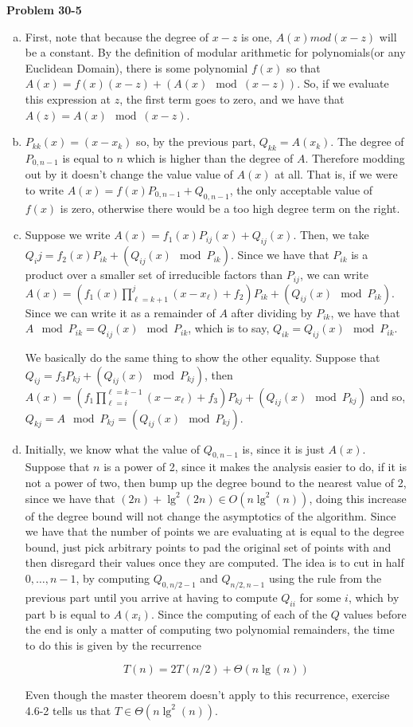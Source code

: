 \documentclass{article}
\begin{document}
\noindent\textbf{Problem 30-5}\\
\begin{enumerate}[a.]
\item
First, note that because the degree of $x-z$ is one, $A(x)mod(x-z)$ will be a constant. By the definition of modular arithmetic for polynomials(or any Euclidean Domain), there is some polynomial $f(x)$ so that $A(x) = f(x)(x-z) + (A(x) \mod(x-z))$. So, if we evaluate this expression at $z$, the first term goes to zero, and we have that $A(z) = A(x)\mod (x-z)$.
\item
$P_{kk}(x) = (x-x_k)$ so, by the previous part, $Q_{kk} = A(x_k)$. The degree of $P_{0,n-1}$ is equal to $n$ which is higher than the degree of $A$. Therefore modding out by it doesn't change the value value of $A(x)$ at all. That is, if we were to write $A(x) = f(x) P_{0,n-1} + Q_{0,n-1}$, the only acceptable value of $f(x)$ is zero, otherwise there would be a too high degree term on the right.
\item
Suppose we write $A(x) = f_1(x) P_{ij}(x) +Q_{ij}(x)$. Then, we take $Q_ij = f_2(x) P_{ik} + (Q_{ij}(x) \mod P_{ik})$. Since we have that $P_{ik}$ is a product over a smaller set of irreducible factors than $P_{ij}$, we can write $A(x) =(f_1(x)\prod_{\ell = k+1}^j (x-x_\ell) + f_2) P_{ik} + (Q_{ij}(x) \mod P_{ik})$. Since we can write it as a remainder of $A$ after dividing by $P_{ik}$, we have that $A \mod P_{ik} =  Q_{ij}(x) \mod P_{ik}$, which is to say,  $Q_{ik} =  Q_{ij}(x) \mod P_{ik}$.

We basically do the same thing to show the other equality. Suppose that $Q_{ij} = f_3 P_{kj} +   (Q_{ij}(x) \mod P_{kj})$, then $A(x) = (f_1\prod_{\ell =i}^{\ell = k-1} (x-x_\ell) + f_3)P_{kj} +  (Q_{ij}(x) \mod P_{kj})$ and so, $Q_{kj} = A \mod P_{kj} =  (Q_{ij}(x) \mod P_{kj})$.

\item
Initially, we know what the value of $Q_{0,n-1}$ is, since it is just $A(x)$. Suppose that $n$ is a power of 2, since it makes the analysis easier to do, if it is not a power of two, then bump up the degree bound to the nearest value of 2, since we have that $(2n) + \lg^2(2n) \in O(n\lg^2(n))$, doing this increase of the degree bound will not change the asymptotics of the algorithm. Since we have that the number of points we are evaluating at is equal to the degree bound, just pick arbitrary points to pad the original set of points with and then disregard their values once they are computed. The idea is to cut in half $0,\ldots,n-1$, by computing $Q_{0,n/2-1}$ and $Q_{n/2,n-1}$ using the rule from the previous part until you arrive at having to compute $Q_{ii}$ for some $i$, which by part b is equal to $A(x_i)$. Since the computing of each of the $Q$ values before the end is only a matter of computing two polynomial remainders, the time to do this is given by the recurrence

\[
T(n) = 2 T(n/2) +\Theta(n\lg(n))
\]

 Even though the master theorem doesn't apply to this recurrence, exercise 4.6-2 tells us that $T\in \Theta(n\lg^2(n))$.


\end{enumerate}
\end{document}
